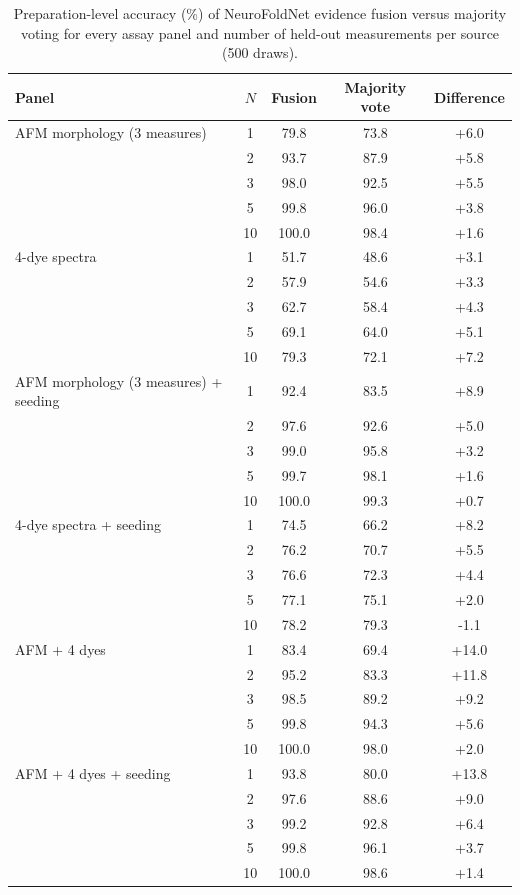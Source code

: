 \begin{table}[!htbp]
\centering\scriptsize
\caption{Preparation-level accuracy (\%) of NeuroFoldNet evidence fusion versus majority voting for every assay panel and number of held-out measurements per source (500 draws).}\label{tab:s_fusion_all}
\begin{tabular}{lcccc}
\toprule
\textbf{Panel} & \textbf{$N$} & \textbf{Fusion} & \textbf{Majority vote} & \textbf{Difference} \\
\midrule
AFM morphology (3 measures) & 1 & 79.8 & 73.8 & +6.0 \\
 & 2 & 93.7 & 87.9 & +5.8 \\
 & 3 & 98.0 & 92.5 & +5.5 \\
 & 5 & 99.8 & 96.0 & +3.8 \\
 & 10 & 100.0 & 98.4 & +1.6 \\
4-dye spectra & 1 & 51.7 & 48.6 & +3.1 \\
 & 2 & 57.9 & 54.6 & +3.3 \\
 & 3 & 62.7 & 58.4 & +4.3 \\
 & 5 & 69.1 & 64.0 & +5.1 \\
 & 10 & 79.3 & 72.1 & +7.2 \\
AFM morphology (3 measures) + seeding & 1 & 92.4 & 83.5 & +8.9 \\
 & 2 & 97.6 & 92.6 & +5.0 \\
 & 3 & 99.0 & 95.8 & +3.2 \\
 & 5 & 99.7 & 98.1 & +1.6 \\
 & 10 & 100.0 & 99.3 & +0.7 \\
4-dye spectra + seeding & 1 & 74.5 & 66.2 & +8.2 \\
 & 2 & 76.2 & 70.7 & +5.5 \\
 & 3 & 76.6 & 72.3 & +4.4 \\
 & 5 & 77.1 & 75.1 & +2.0 \\
 & 10 & 78.2 & 79.3 & -1.1 \\
AFM + 4 dyes & 1 & 83.4 & 69.4 & +14.0 \\
 & 2 & 95.2 & 83.3 & +11.8 \\
 & 3 & 98.5 & 89.2 & +9.2 \\
 & 5 & 99.8 & 94.3 & +5.6 \\
 & 10 & 100.0 & 98.0 & +2.0 \\
AFM + 4 dyes + seeding & 1 & 93.8 & 80.0 & +13.8 \\
 & 2 & 97.6 & 88.6 & +9.0 \\
 & 3 & 99.2 & 92.8 & +6.4 \\
 & 5 & 99.8 & 96.1 & +3.7 \\
 & 10 & 100.0 & 98.6 & +1.4 \\
\bottomrule
\end{tabular}
\end{table}

